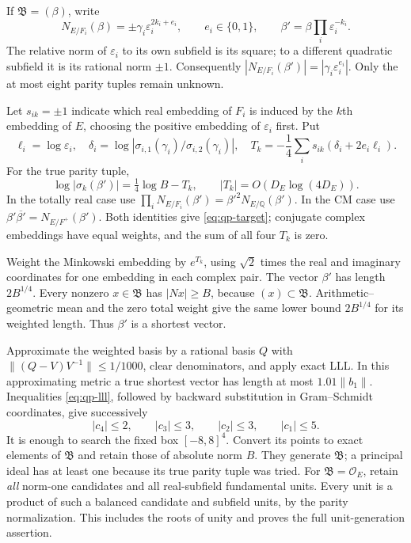 If $\mathfrak B=(\beta)$, write
\[
 N_{E/F_i}(\beta)=\pm\gamma_i\varepsilon_i^{2k_i+e_i},
 \qquad e_i\in\{0,1\},
 \qquad \beta'=\beta\prod_i\varepsilon_i^{-k_i}.
\]
The relative norm of $\varepsilon_i$ to its own subfield is its square;
to a different quadratic subfield it is its rational norm $\pm1$.
Consequently
$|N_{E/F_i}(\beta')|=|\gamma_i\varepsilon_i^{e_i}|$.
Only the at most eight parity tuples remain unknown.

Let $s_{ik}=\pm1$ indicate which real embedding of $F_i$ is induced by
the $k$th embedding of $E$, choosing the positive embedding of
$\varepsilon_i$ first.  Put
\[
 \ell_i=\log\varepsilon_i,\quad
 \delta_i=\log|\sigma_{i,1}(\gamma_i)/\sigma_{i,2}(\gamma_i)|,
 \quad
 T_k=-\frac14\sum_i s_{ik}(\delta_i+2e_i\ell_i).
\]
For the true parity tuple,
\begin{equation}
 \log|\sigma_k(\beta')|=\tfrac14\log B-T_k,
 \qquad |T_k|=O(D_E\log(4D_E)).
 \label{eq:qp-target}
\end{equation}
In the totally real case use
$\prod_iN_{E/F_i}(\beta')=\beta'^2N_{E/\mathbb Q}(\beta')$.
In the CM case use
$\beta'\overline{\beta'}=N_{E/F^+}(\beta')$.
Both identities give \eqref{eq:qp-target}; conjugate complex embeddings
have equal weights, and the sum of all four $T_k$ is zero.

Weight the Minkowski embedding by $e^{T_k}$, using $\sqrt2$ times the
real and imaginary coordinates for one embedding in each complex pair.
The vector $\beta'$ has length $2B^{1/4}$.  Every nonzero
$x\in\mathfrak B$ has $|Nx|\geq B$, because $(x)\subset\mathfrak B$.
Arithmetic--geometric mean and the zero total weight give the same lower
bound $2B^{1/4}$ for its weighted length.  Thus $\beta'$ is a shortest
vector.

Approximate the weighted basis by a rational basis $Q$ with
$\|(Q-V)V^{-1}\|\leq1/1000$, clear denominators, and apply exact LLL.
In this approximating metric a true shortest vector has length at most
$1.01\|b_1\|$.  Inequalities \eqref{eq:qp-lll}, followed by backward
substitution in Gram--Schmidt coordinates, give successively
\[
 |c_4|\leq2,\qquad |c_3|\leq3,\qquad |c_2|\leq3,
 \qquad |c_1|\leq5.
\]
It is enough to search the fixed box $[-8,8]^4$.  Convert its points to
exact elements of $\mathfrak B$ and retain those of absolute norm $B$.
They generate $\mathfrak B$; a principal ideal has at least one because
its true parity tuple was tried.  For $\mathfrak B=\mathcal O_E$, retain
\emph{all} norm-one candidates and all real-subfield fundamental units.
Every unit is a product of such a balanced candidate and subfield units,
by the parity normalization.  This includes the roots of unity and
proves the full unit-generation assertion.

